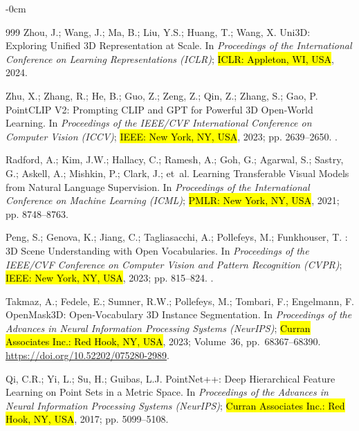 \documentclass[electronics,article,accept,pdftex,moreauthors]{Definitions/mdpi}
\begin{document}
\begin{adjustwidth}{-\extralength}{0cm}
\begin{thebibliography}{999}
Zhou, J.; Wang, J.; Ma, B.; Liu, Y.S.; Huang, T.; Wang, X.
\newblock Uni3D: Exploring Unified 3D Representation at Scale.
\newblock In \textit{Proceedings of the International Conference on Learning Representations (ICLR)}; \hl{ICLR: Appleton, WI, USA}, {2024}. 


Zhu, X.; Zhang, R.; He, B.; Guo, Z.; Zeng, Z.; Qin, Z.; Zhang, S.; Gao, P.
\newblock Point{CLIP} {V}2: Prompting {CLIP} and {GPT} for Powerful 3{D}
  Open-World Learning.
\newblock In \textit{Proceedings of the IEEE/CVF International Conference on Computer Vision (ICCV)}; \hl{IEEE: New York, NY, USA},
  2023; pp. 2639--2650.
.

Radford, A.; Kim, J.W.; Hallacy, C.; Ramesh, A.; Goh, G.; Agarwal, S.; Sastry,
  G.; Askell, A.; Mishkin, P.; Clark, J.;  et~al.
\newblock Learning Transferable Visual Models from Natural Language Supervision.
\newblock In \textit{Proceedings of the International Conference on Machine Learning (ICML)};  \hl{PMLR: New York, NY, USA}, {2021};
  pp. 8748--8763.

Peng, S.; Genova, K.; Jiang, C.; Tagliasacchi, A.; Pollefeys, M.; Funkhouser,
  T.
: {3D} Scene Understanding with Open Vocabularies.
\newblock In \textit{Proceedings of the IEEE/CVF Conference on Computer Vision and Pattern
  Recognition (CVPR)}; \hl{IEEE: New York, NY, USA},  2023; pp. 815--824.
.

Takmaz, A.; Fedele, E.; Sumner, R.W.; Pollefeys, M.; Tombari, F.; Engelmann, F.
\newblock OpenMask3D: Open-Vocabulary {3D} Instance Segmentation.
\newblock In \textit{Proceedings of the Advances in Neural Information Processing
  Systems (NeurIPS)}; \hl{Curran Associates Inc.: Red Hook, NY, USA}, {2023}; Volume~36, pp.~68367--68390. {\url{https://doi.org/10.52202/075280-2989}}.

Qi, C.R.; Yi, L.; Su, H.; Guibas, L.J.
\newblock PointNet++: Deep Hierarchical Feature Learning on Point Sets in a Metric Space.
\newblock In \textit{Proceedings of the Advances in Neural Information Processing
  Systems (NeurIPS)}; \hl{Curran Associates Inc.: Red Hook, NY, USA}, {2017}; pp. 5099--5108.


\end{thebibliography}
\end{adjustwidth}
\end{document}
